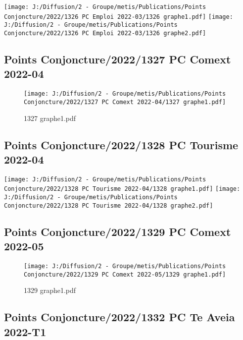\documentclass[
]{article}
\begin{document}
\texttt{[image: J:/Diffusion/2 - Groupe/metis/Publications/Points Conjoncture/2022/1326 PC Emploi 2022-03/1326 graphe1.pdf]}
\texttt{[image: J:/Diffusion/2 - Groupe/metis/Publications/Points Conjoncture/2022/1326 PC Emploi 2022-03/1326 graphe2.pdf]}

\hypertarget{points-conjoncture20221327-pc-comext-2022-04}{%
\subsection{Points Conjoncture/2022/1327 PC Comext
2022-04}\label{points-conjoncture20221327-pc-comext-2022-04}}

\begin{figure}
\centering
\texttt{[image: J:/Diffusion/2 - Groupe/metis/Publications/Points Conjoncture/2022/1327 PC Comext 2022-04/1327 graphe1.pdf]}
\caption{1327 graphe1.pdf}
\end{figure}

\hypertarget{points-conjoncture20221328-pc-tourisme-2022-04}{%
\subsection{Points Conjoncture/2022/1328 PC Tourisme
2022-04}\label{points-conjoncture20221328-pc-tourisme-2022-04}}

\texttt{[image: J:/Diffusion/2 - Groupe/metis/Publications/Points Conjoncture/2022/1328 PC Tourisme 2022-04/1328 graphe1.pdf]}
\texttt{[image: J:/Diffusion/2 - Groupe/metis/Publications/Points Conjoncture/2022/1328 PC Tourisme 2022-04/1328 graphe2.pdf]}

\hypertarget{points-conjoncture20221329-pc-comext-2022-05}{%
\subsection{Points Conjoncture/2022/1329 PC Comext
2022-05}\label{points-conjoncture20221329-pc-comext-2022-05}}

\begin{figure}
\centering
\texttt{[image: J:/Diffusion/2 - Groupe/metis/Publications/Points Conjoncture/2022/1329 PC Comext 2022-05/1329 graphe1.pdf]}
\caption{1329 graphe1.pdf}
\end{figure}

\hypertarget{points-conjoncture20221332-pc-te-aveia-2022-t1}{%
\subsection{Points Conjoncture/2022/1332 PC Te Aveia
2022-T1}\label{points-conjoncture20221332-pc-te-aveia-2022-t1}}
\end{document}
